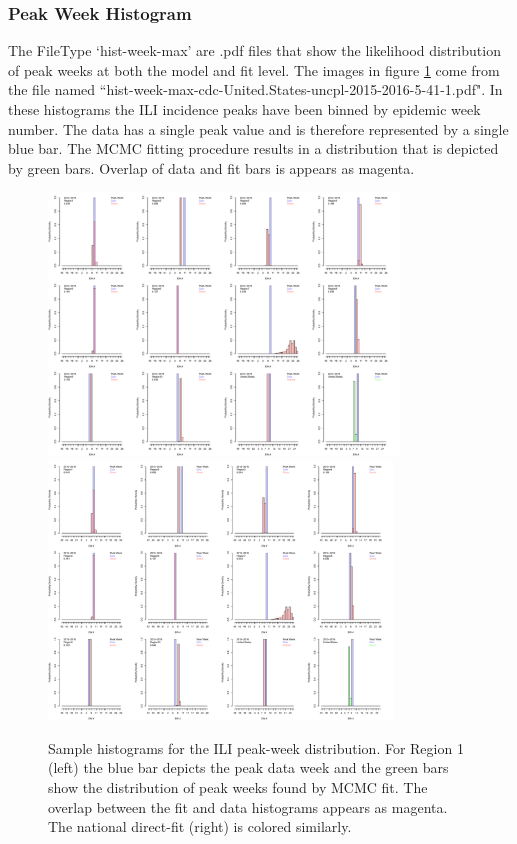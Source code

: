 \documentclass[a4paper]{article}
\begin{document}
\subsubsection{Peak Week Histogram}
The FileType `hist-week-max' are .pdf files that show the likelihood distribution of peak weeks at both the model and fit level.  The images in figure \ref{fig:peak_hist} come from the file named ``hist-week-max-cdc-United.States-uncpl-2015-2016-5-41-1.pdf".  In these histograms the ILI incidence peaks have been binned by epidemic week number.  The data has a single peak value and is therefore represented by a single blue bar.  The MCMC fitting procedure results in a distribution that is depicted by green bars.  Overlap of data and fit bars is appears as magenta.
\begin{figure}[htbp]
  \centering
  \includegraphics[height=2.75in,keepaspectratio]{figures/Reg1_2015_hist_peak.pdf}
  \hspace{0.4in}
  \includegraphics[height=2.7in,keepaspectratio]{figures/USdirect_2015_hist_peak.pdf}
  \caption{Sample histograms for the ILI peak-week distribution. For Region 1 (left) the blue bar depicts the peak data week and the green bars show the distribution of peak weeks found by MCMC fit.  The overlap between the fit and data histograms appears as magenta.  The national direct-fit (right) is colored similarly.}
  \label{fig:peak_hist}
\end{figure}
\end{document}
